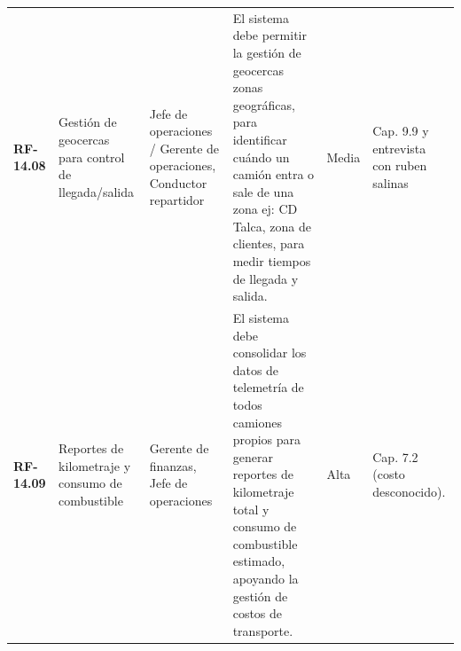 \begin{longtable}{p{1.7cm} p{2.3cm} p{1.9cm} p{5.0cm} p{1.1cm} p{1.9cm}}
\textbf{RF-14.08} & Gestión de geocercas para control de llegada/salida & Jefe de operaciones / Gerente de operaciones, Conductor repartidor & El sistema debe permitir la gestión de geocercas zonas geográficas, para identificar cuándo un camión entra o sale de una zona ej: CD Talca, zona de clientes, para medir tiempos de llegada y salida. & Media & Cap. 9.9 y entrevista con ruben salinas \\
\textbf{RF-14.09} & Reportes de kilometraje y consumo de combustible & Gerente de finanzas, Jefe de operaciones & El sistema debe consolidar los datos de telemetría de todos camiones propios para generar reportes de kilometraje total y consumo de combustible estimado, apoyando la gestión de costos de transporte. & Alta & Cap. 7.2 (costo desconocido). \\
\end{longtable}

